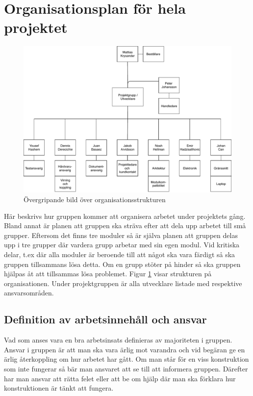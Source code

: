 \documentclass[projektplan/plan.tex]{subfiles}
\begin{document}
\section{Organisationsplan för hela projektet}


\begin{figure}[h]
    \centering
    \includegraphics[width=0.6\linewidth]{projektplan/figures/orgplan.pdf}
    \caption{Övergripande bild över organisationsstrukturen}
    \label{fig:orgplan}
\end{figure}

Här beskrivs hur gruppen kommer att organisera arbetet under projektets gång.
Bland annat är planen att gruppen ska sträva efter att dela upp arbetet till
små grupper. Eftersom det finns tre moduler så är själva planen att gruppen
delas upp i tre grupper där vardera grupp arbetar med sin egen modul. Vid
kritiska delar, t.ex där alla moduler är beroende till att något ska vara
färdigt så ska gruppen tillsammans lösa detta. Om en grupp stöter på hinder
så ska gruppen hjälpas åt att tillsammas lösa problemet. Figur \ref{fig:orgplan} visar strukturen på organisationen. Under projektgruppen är alla utvecklare listade med respektive ansvarsområden.  

\subsection{Definition av arbetsinnehåll och ansvar}
Vad som anses vara en bra arbetsinsats definieras av majoriteten i gruppen.
Ansvar i gruppen är att man ska vara ärlig mot varandra och vid begäran ge en 
ärlig återkoppling om hur arbetet har gått. Om man står för en viss
konstruktion som inte fungerar så bär man ansvaret att se till att informera
gruppen. Därefter har man ansvar att rätta felet eller att be om hjälp där
man ska förklara hur konstruktionen är tänkt att fungera.
\end{document}
